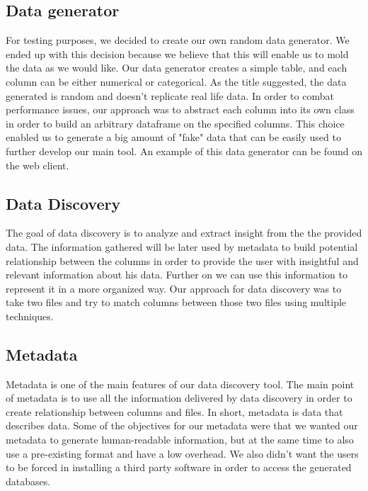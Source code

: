 \subsection{Data generator}
For testing purposes, we decided to create our own random data generator. We ended up with this decision because we believe that this will enable us to mold the data as we would like. Our data generator creates a simple table, and each column can be either numerical or categorical. As the title suggested, the data generated is random and doesn't replicate real life data. In order to combat performance issues, our approach was to abstract each column into its own class in order to build an arbitrary dataframe
on the specified columns. This choice enabled us to generate a big amount of "fake" data that can be easily used to further develop our main tool. An example of this data generator can be found on the web client.
\vspace{5mm} %
\subsection{Data Discovery}
The goal of data discovery is to analyze and extract insight from the the provided data. The information gathered will be later used by metadata to build potential relationship between the columns in order to provide the user with insightful and relevant information about his data. Further on we can use this information to represent it in a more organized way. Our approach for data discovery was to take two files and try to match columns between those two files using multiple techniques.

\vspace{5mm} %
\subsection{Metadata}
Metadata is one of the main features of our data discovery tool. The main point of metadata is to use all the information delivered by data discovery in order to create relationship between columns and files. In short, metadata is data that describes data.
\newline
Some of the objectives for our metadata were that we wanted our metadata to generate human-readable information, but at the same time to also use a pre-existing format and have a low overhead. We also didn't want the users to be forced in installing a third party software in order to access the generated databases.
\newline

\clearpage
